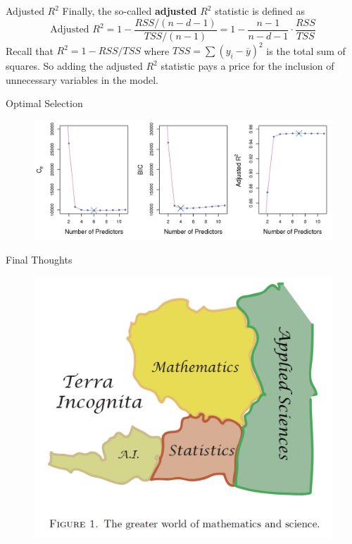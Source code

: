 \documentclass{beamer}
\begin{document}
\begin{frame}{Adjusted $R^2$}
	Finally, the so-called {\bf adjusted} $R^2$ statistic is defined as
	\begin{equation*}
		\textrm{Adjusted }R^2= 1 - \frac{RSS/(n-d-1)}{TSS/(n-1)}= 1 - \frac{n-1}{n-d-1} \cdot \frac{RSS}{TSS}
	\end{equation*}
Recall that $R^2= 1 - RSS/TSS$ where $TSS= \sum (y_i - \overline{y})^2$ is the total sum of squares. 
 So adding the adjusted $R^2$ statistic pays a price for the inclusion of unnecessary variables in the model. 

\end{frame}

\begin{frame}{Optimal Selection}
	
	
 \begin{figure}[h]
	\centering
	\includegraphics[scale=0.5]{../../Figures/fig_cp.png}
\end{figure}
\end{frame}


\begin{frame}{Final Thoughts}
	
	
	\begin{figure}[h]
		\centering
		\includegraphics[scale=0.5]{../../Figures/fig_efron_paper.png}
	\end{figure}
\end{frame}
		
\end{document}
